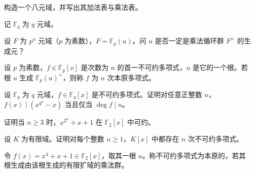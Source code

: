\noindent\begin{minipage}{\textwidth}
构造一个八元域，并写出其加法表与乘法表。
\end{minipage}\par\vfill
\newpage
\noindent\begin{minipage}{\textwidth}
记 $\mathbb{F}_q$ 为 $q$ 元域。
\end{minipage}\par\vfill
\noindent\begin{minipage}{\textwidth}
设 $F$ 为 $p^n$ 元域（$p$ 为素数），$F=\mathbb{F}_p(u)$。问 $u$ 是否一定是乘法循环群 $F^\times$ 的生成元？
\end{minipage}\par\vfill
\noindent\begin{minipage}{\textwidth}
设 $p$ 为素数，$f\in\mathbb{F}_p[x]$ 是次数为 $n$ 的首一不可约多项式，$u$ 是它的一个根。若根 $u$ 生成 $\mathbb{F}_p(u)^\times$，则称 $f$ 为 $n$ 次本原多项式。
\end{minipage}\par\vfill
\newpage
\noindent\begin{minipage}{\textwidth}
设 $\mathbb{F}_q$ 为 $q$ 元域，$f\in\mathbb{F}_q[x]$ 是不可约多项式。证明对任意正整数 $n$，$f(x)\mid (x^{q^n}-x)$ 当且仅当 $\deg f\mid n$。
\end{minipage}\par\vfill
\noindent\begin{minipage}{\textwidth}
证明当 $n\ge3$ 时，$x^{2^n}+x+1$ 在 $\mathbb{F}_2[x]$ 中可约。
\end{minipage}\par\vfill
\noindent\begin{minipage}{\textwidth}
设 $K$ 为有限域。证明对每个整数 $n\ge1$，$K[x]$ 中都存在 $n$ 次不可约多项式。
\end{minipage}\par\vfill
\newpage
\noindent\begin{minipage}{\textwidth}
令 $f(x)=x^4+x+1\in\mathbb{F}_2[x]$，取其一根 $u$。称不可约多项式为本原的，若其根生成由该根生成的有限扩域的乘法群。
\end{minipage}\par\vfill
